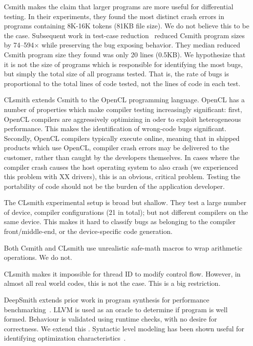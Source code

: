 Csmith makes the claim that larger programs are more useful for differential testing. In their experiments, they found the most distinct crash errors in programs containing 8K-16K tokens (81KB file size). We do not believe this to be the case. Subsequent work in test-case reduction~\cite{Regehr2012a} reduced Csmith program sizes by 74--594$\times$ while preserving the bug exposing behavior. They median reduced Csmith program size they found was only 20 lines (0.5KB). We hypothesize that it is not the size of programs which is responsible for identifying the most bugs, but simply the total size of all programs tested. That is, the rate of bugs is proportional to the total lines of code tested, not the lines of code in each test.

CLsmith extends Csmith to the OpenCL programming language. OpenCL has a number of properties which make compiler testing increasingly significant: first, OpenCL compilers are aggressively optimizing in oder to exploit heterogeneous performance. This makes the identification of wrong-code bugs significant. Secondly, OpenCL compilers typically execute online, meaning that in shipped products which use OpenCL, compiler crash errors may be delivered to the customer, rather than caught by the developers themselves. In cases where the compiler crash causes the host operating system to also crash (we experienced this problem with XX drivers), this is an obvious, critical problem. Testing the portability of code should not be the burden of the application developer.

The CLsmith experimental setup is broad but shallow. They test a large number of device, compiler configurations (21 in total); but not different compilers on the same device. This makes it hard to classify bugs as belonging to the compiler front/middle-end, or the device-specific code generation.

Both Csmith and CLsmith use unrealistic safe-math macros to wrap arithmetic operations. We do not.

CLsmith makes it impossible for thread ID to modify control flow. However, in almost all real world codes, this is not the case. This is a big restriction.

DeepSmith extends prior work in program synthesis for performance benchmarking~\cite{Cummins2017a}. LLVM is used as an oracle to determine if program is well formed. Behaviour is validated using runtime checks, with no desire for correctness. We extend this \cc{\ldots}. Syntactic level modeling has been shown useful for identifying optimization characteristics~\cite{Cummins2017b}.

